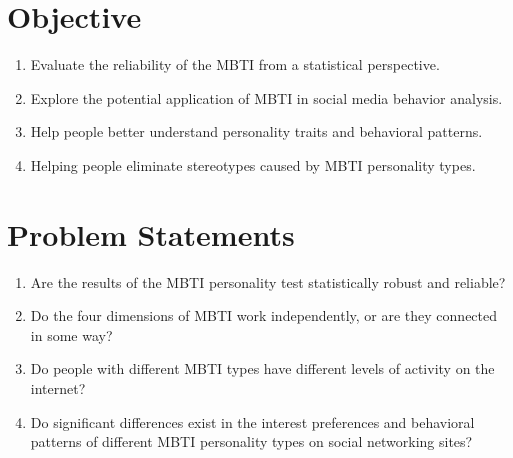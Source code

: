 \documentclass[12pt]{article}
\numberwithin{figure}{section}  %
\begin{document}
	\section{Objective}
	\begin{enumerate} 
		\item Evaluate the reliability of the MBTI from a statistical
		perspective.    
		\item Explore the potential application of MBTI in
		social media behavior analysis.    
		\item Help people better understand personality traits and behavioral
		patterns.    
		\item Helping people eliminate stereotypes caused by MBTI personality
		types.
	\end{enumerate}
	
	\section{Problem Statements}
	\begin{enumerate}
		\item Are the results of the MBTI personality test statistically robust
		and reliable?
		\item Do the four dimensions of MBTI work independently, or are they
		connected in some way?
		\item Do people with different MBTI types have different levels of
		activity on the internet?
		\item Do significant differences exist in the interest preferences and
		behavioral patterns of different MBTI personality types on social
		networking sites?
	\end{enumerate}
	
\end{document}
